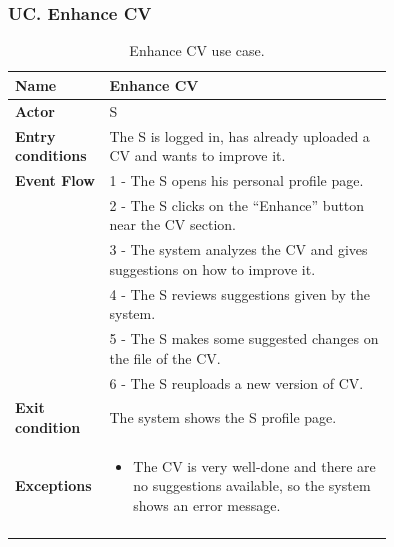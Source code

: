 \subsubsection*{UC\cuc . Enhance CV}
\begin{center}
    \begin{longtable}{|l|p{0.75\linewidth}|}
        \hline
        \textbf{Name}               & Enhance CV\\
        \hline
        \textbf{Actor}              & S\\
        \hline
        \textbf{Entry conditions}   & The S is logged in, has already uploaded a CV and wants to improve it.\\
        \hline
        \textbf{Event Flow}         & 1 - The S opens his personal profile page. \\
        & 2 - The S clicks on the “Enhance” button near the CV section. \\
        & 3 - The system analyzes the CV and gives suggestions on how to improve it. \\
        & 4 - The S reviews suggestions given by the system. \\
        & 5 - The S makes some suggested changes on the file of the CV. \\
        & 6 - The S reuploads a new version of CV. \\
        \hline
        \textbf{Exit condition}   & The system shows the S profile page. \\       
        \hline
        \textbf{Exceptions}       & \begin{itemize}
            \item The CV is very well-done and there are no suggestions available, so the system shows an error message.
        \end{itemize}\\
        \hline
        \caption{Enhance CV use case.}
        \label{tab: enhance_cv_use_case}
    \end{longtable}
\end{center}
 

